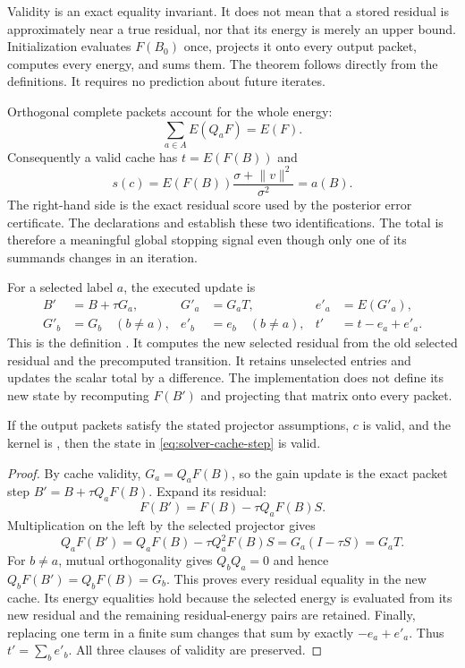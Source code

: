 Validity is an exact equality invariant. It does not mean that a stored residual
is approximately near a true residual, nor that its energy is merely an upper
bound. Initialization evaluates $F(B_0)$ once, projects it onto every output
packet, computes every energy, and sums them. The theorem
 follows directly from the definitions. It requires no
prediction about future iterates.

Orthogonal complete packets account for the whole energy:
\[
 \sum_{a\in A}E(Q_aF)=E(F).
\]
Consequently a valid cache has $t=E(F(B))$ and
\begin{equation}
 s(c)=E(F(B))\frac{\sigma+\lVert v\rVert^2}{\sigma^2}=a(B).
 \label{eq:solver-score}
\end{equation}
The right-hand side is the exact residual score used by the posterior error
certificate. The declarations  and
 establish these two identifications. The total is therefore a
meaningful global stopping signal even though only one of its summands changes
in an iteration.

For a selected label $a$, the executed update is
\begin{align}
 B'&=B+\tau G_a, &G'_a&=G_aT, &e'_a&=E(G'_a),\nonumber\\
 G'_b&=G_b\quad(b\ne a), &e'_b&=e_b\quad(b\ne a),
 &t'&=t-e_a+e'_a.
 \label{eq:solver-cache-step}
\end{align}
This is the definition . It computes the new
selected residual from the old selected residual and the precomputed transition.
It retains unselected entries and updates the scalar total by a difference. The
implementation does not define its new state by recomputing $F(B')$ and projecting
that matrix onto every packet.

\begin{proposition}
If the output packets satisfy the stated projector assumptions, $c$ is valid,
and the kernel is , then the state in
\eqref{eq:solver-cache-step} is valid.
\end{proposition}
\begin{proof}
By cache validity, $G_a=Q_aF(B)$, so the gain update is the exact packet step
$B'=B+\tau Q_aF(B)$. Expand its residual:
\[
 F(B')=F(B)-\tau Q_aF(B)S.
\]
Multiplication on the left by the selected projector gives
\[
 Q_aF(B')=Q_aF(B)-\tau Q_a^2F(B)S
          =G_a(I-\tau S)=G_aT.
\]
For $b\ne a$, mutual orthogonality gives $Q_bQ_a=0$ and hence
$Q_bF(B')=Q_bF(B)=G_b$. This proves every residual equality in the new cache.
Its energy equalities hold because the selected energy is evaluated from its new
residual and the remaining residual-energy pairs are retained. Finally, replacing
one term in a finite sum changes that sum by exactly $-e_a+e'_a$. Thus
$t'=\sum_b e'_b$. All three clauses of validity are preserved.
\end{proof}

